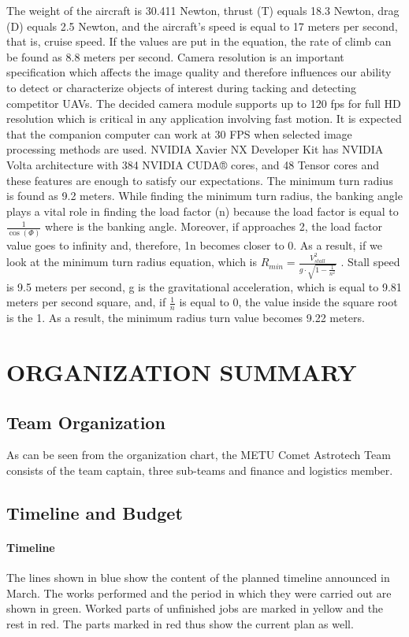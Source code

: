 \documentclass[12pt]{article}
\begin{document}
The weight of the aircraft is 30.411 Newton, thrust (T) equals 18.3 Newton, drag (D) equals 2.5 Newton, and the aircraft's speed is equal to 17 meters per second, that is, cruise speed. If the values are put in the equation, the rate of climb can be found as 8.8 meters per second.
\justify
Camera resolution is an important specification which affects the image quality and therefore influences our ability to detect or characterize objects of interest during tacking and detecting competitor UAVs. The decided camera module supports up to 120 fps for full HD resolution which is critical in any application involving fast motion.
\justify
It is expected that the companion computer can work at 30 FPS when selected image processing methods are used. NVIDIA Xavier NX Developer Kit has NVIDIA Volta architecture with 384 NVIDIA CUDA® cores, and 48 Tensor cores and these features are enough to satisfy our expectations. 
\justify
The minimum turn radius is found as 9.2 meters. While finding the minimum turn radius, the banking angle plays a vital role in finding the load factor (n) because the load factor is equal to $\frac{1}{\cos(\Phi)}$ where \Phi is the banking angle. Moreover, if \Phi  approaches 2, the load factor value goes to infinity and, therefore, 1n becomes closer to 0. As a result, if we look at the minimum turn radius equation, which is $R_{min}=\frac{V^2_{stall}}{g \cdot \sqrt{1-\frac{1}{n^2}}}$ . Stall speed is 9.5 meters per second, g is the gravitational acceleration, which is equal to 9.81 meters per second square, and, if $\frac{1}{n}$ is equal to 0, the value inside the square root is the 1. As a result, the minimum radius turn value becomes 9.22 meters.


\section{ORGANIZATION SUMMARY}
\subsection{Team Organization}
\justify As can be seen from the organization chart, the METU Comet Astrotech Team consists of the team captain, three  sub-teams and finance and logistics member.

\subsection{Timeline and Budget}
\paragraph*{Timeline} The lines shown in blue show the content of the planned timeline announced in March. The works performed and the period in which they were carried out are shown in green. Worked parts of unfinished jobs are marked in yellow and the rest in red. The parts marked in red thus show the current plan as well.
\end{document}
